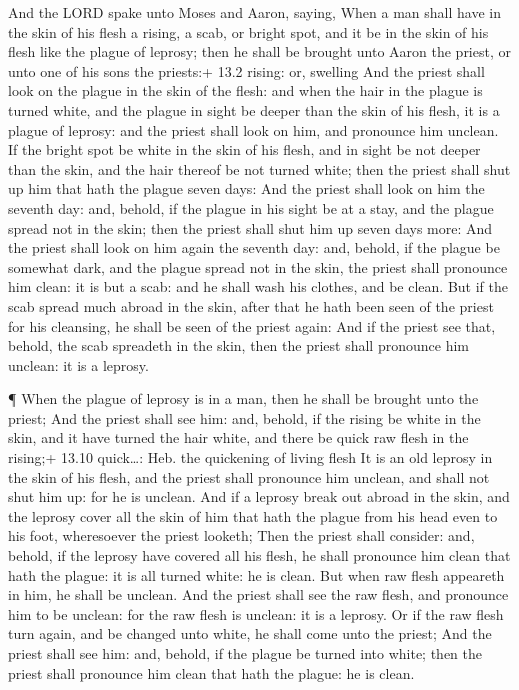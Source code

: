  And the LORD spake unto Moses and Aaron, saying,
 When a man shall have in the skin of his flesh a rising, a
scab, or bright spot, and it be in the skin of his flesh like the plague
of leprosy; then he shall be brought unto Aaron the priest, or unto one
of his sons the priests:+ 13.2 rising: or, swelling  And the
priest shall look on the plague in the skin of the flesh: and when the
hair in the plague is turned white, and the plague in sight be deeper
than the skin of his flesh, it is a plague of leprosy: and the priest
shall look on him, and pronounce him unclean.  If the bright
spot be white in the skin of his flesh, and in sight be not deeper than
the skin, and the hair thereof be not turned white; then the priest
shall shut up him that hath the plague seven days:  And the
priest shall look on him the seventh day: and, behold, if the plague in
his sight be at a stay, and the plague spread not in the skin; then the
priest shall shut him up seven days more:  And the priest
shall look on him again the seventh day: and, behold, if the plague be
somewhat dark, and the plague spread not in the skin, the priest shall
pronounce him clean: it is but a scab: and he shall wash his clothes,
and be clean.  But if the scab spread much abroad in the
skin, after that he hath been seen of the priest for his cleansing, he
shall be seen of the priest again:  And if the priest see
that, behold, the scab spreadeth in the skin, then the priest shall
pronounce him unclean: it is a leprosy.

 ¶ When the plague of leprosy is in a man, then he shall be
brought unto the priest;  And the priest shall see him:
and, behold, if the rising be white in the skin, and it have turned the
hair white, and there be quick raw flesh in the rising;+ 13.10
quick\ldots: Heb. the quickening of living flesh  It is an
old leprosy in the skin of his flesh, and the priest shall pronounce him
unclean, and shall not shut him up: for he is unclean.  And
if a leprosy break out abroad in the skin, and the leprosy cover all the
skin of him that hath the plague from his head even to his foot,
wheresoever the priest looketh;  Then the priest shall
consider: and, behold, if the leprosy have covered all his flesh, he
shall pronounce him clean that hath the plague: it is all turned white:
he is clean.  But when raw flesh appeareth in him, he shall
be unclean.  And the priest shall see the raw flesh, and
pronounce him to be unclean: for the raw flesh is unclean: it is a
leprosy.  Or if the raw flesh turn again, and be changed
unto white, he shall come unto the priest;  And the priest
shall see him: and, behold, if the plague be turned into white; then the
priest shall pronounce him clean that hath the plague: he is clean.

